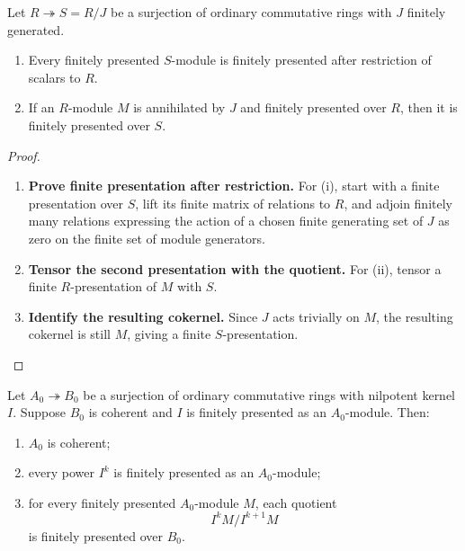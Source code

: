 \begin{lemma}
\label{lem:finite-presentation-quotient-comparison}
Let \(R\twoheadrightarrow S=R/J\) be a surjection of ordinary commutative
rings with \(J\) finitely generated.
\begin{enumerate}[label=(\roman*)]
    \item Every finitely presented \(S\)-module is finitely presented after
    restriction of scalars to \(R\).
    \item If an \(R\)-module \(M\) is annihilated by \(J\) and finitely
    presented over \(R\), then it is finitely presented over \(S\).
\end{enumerate}
\end{lemma}

\begin{proof}
\leavevmode
\begin{enumerate}[label=\textup{(\arabic*)}]
    \item \textbf{Prove finite presentation after restriction.}
    For \textup{(i)}, start with a finite presentation over \(S\), lift its
    finite matrix of relations to \(R\), and adjoin finitely many relations
    expressing the action of a chosen finite generating set of \(J\) as zero on
    the finite set of module generators.
    \item \textbf{Tensor the second presentation with the quotient.}
    For \textup{(ii)}, tensor a finite
    \(R\)-presentation of \(M\) with \(S\).
    \item \textbf{Identify the resulting cokernel.}
    Since \(J\) acts trivially on
    \(M\), the resulting cokernel is still \(M\), giving a finite
    \(S\)-presentation.
\end{enumerate}
\end{proof}

\begin{lemma}
\label{lem:coherence-nilpotent-extension}
Let \(A_0\twoheadrightarrow B_0\) be a surjection of ordinary commutative
rings with nilpotent kernel \(I\). Suppose \(B_0\) is coherent and \(I\) is
finitely presented as an \(A_0\)-module. Then:
\begin{enumerate}[label=(\roman*)]
    \item \(A_0\) is coherent;
    \item every power \(I^k\) is finitely presented as an \(A_0\)-module;
    \item for every finitely presented \(A_0\)-module \(M\), each quotient
    \[
        I^kM/I^{k+1}M
    \]
    is finitely presented over \(B_0\).
\end{enumerate}
\end{lemma}

